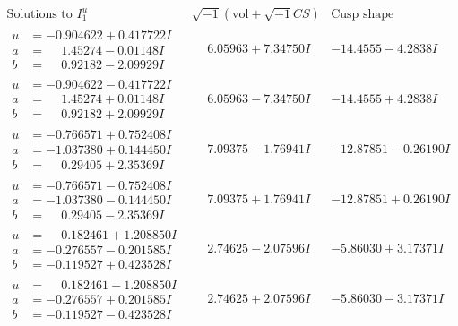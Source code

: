\documentclass[1p]{elsarticle_modified}
\theoremstyle{definition}
\newcommand{\I}{\sqrt{-1}}
\begin{document}
$$\begin{array}{c|c|c}  
\text{Solutions to }I^u_{1}& \I (\text{vol} + \sqrt{-1}CS) & \text{Cusp shape}\\
 \hline 
\begin{aligned}
u &= -0.904622 + 0.417722 I \\
a &= \phantom{-}1.45274 - 0.01148 I \\
b &= \phantom{-}0.92182 - 2.09929 I\end{aligned}
 & \phantom{-}6.05963 + 7.34750 I & -14.4555 - 4.2838 I \\ \hline\begin{aligned}
u &= -0.904622 - 0.417722 I \\
a &= \phantom{-}1.45274 + 0.01148 I \\
b &= \phantom{-}0.92182 + 2.09929 I\end{aligned}
 & \phantom{-}6.05963 - 7.34750 I & -14.4555 + 4.2838 I \\ \hline\begin{aligned}
u &= -0.766571 + 0.752408 I \\
a &= -1.037380 + 0.144450 I \\
b &= \phantom{-}0.29405 + 2.35369 I\end{aligned}
 & \phantom{-}7.09375 - 1.76941 I & -12.87851 - 0.26190 I \\ \hline\begin{aligned}
u &= -0.766571 - 0.752408 I \\
a &= -1.037380 - 0.144450 I \\
b &= \phantom{-}0.29405 - 2.35369 I\end{aligned}
 & \phantom{-}7.09375 + 1.76941 I & -12.87851 + 0.26190 I \\ \hline\begin{aligned}
u &= \phantom{-}0.182461 + 1.208850 I \\
a &= -0.276557 - 0.201585 I \\
b &= -0.119527 + 0.423528 I\end{aligned}
 & \phantom{-}2.74625 - 2.07596 I & -5.86030 + 3.17371 I \\ \hline\begin{aligned}
u &= \phantom{-}0.182461 - 1.208850 I \\
a &= -0.276557 + 0.201585 I \\
b &= -0.119527 - 0.423528 I\end{aligned}
 & \phantom{-}2.74625 + 2.07596 I & -5.86030 - 3.17371 I \\ \hline\begin{aligned}

\end{aligned}
\end{array}$$
\end{document}
